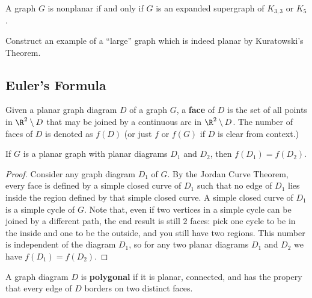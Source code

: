 \begin{theorem} A graph $G$ is nonplanar if and only if $G$ is an expanded supergraph of $K_{3,3}$ or $K_5$.
\end{theorem}

\begin{example} Construct an example of a ``large'' graph which is indeed planar by Kuratowski's Theorem.
\end{example}

\subsection{Euler's Formula}
\begin{definition} Given a planar graph diagram $D$ of a graph $G$, a \textbf{face} of $D$ is the set of all points in $\R^2 \setminus D$ that may be joined by a continuous arc in $\R^2 \setminus D$.  The number of faces of $D$ is denoted as $f(D)$ (or just $f$ or $f(G)$ if $D$ is clear from context.)
\end{definition}

\begin{theorem} If $G$ is a planar graph with planar diagrams $D_1$ and $D_2$, then $f(D_1) = f(D_2)$.
\end{theorem}
\begin{proof}
  Consider any graph diagram $D_1$ of $G$. By the Jordan Curve Theorem, every face is defined by a simple closed curve of $D_1$ such that no edge of $D_1$ lies inside the region defined by that simple closed curve. A simple closed curve of $D_1$ is a simple cycle of $G$. Note that, even if two vertices in a simple cycle can be joined by a different path, the end result is still $2$ faces: pick one cycle to be in the inside and one to be the outside, and you still have two regions. This number is independent of the diagram $D_1$, so for any two planar diagrams $D_1$ and $D_2$ we have $f(D_1) = f(D_2)$.
\end{proof}

\begin{definition} A graph diagram $D$ is \textbf{polygonal} if it is planar, connected, and has the propery that every edge of $D$ borders on two distinct faces.
\end{definition}

